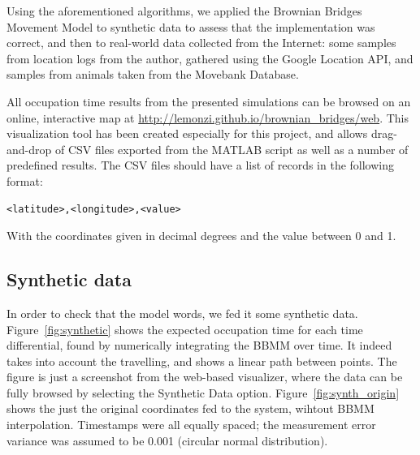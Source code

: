 \documentclass[12pt]{article}
\begin{document}
Using the aforementioned algorithms, we applied the Brownian Bridges Movement Model to synthetic data to assess that the implementation was correct, and then to real-world data collected from the Internet: some samples from location logs from the author, gathered using the Google Location API, and samples from animals taken from the Movebank Database.

All occupation time results from the presented simulations can be browsed on an online, interactive map at \url{http://lemonzi.github.io/brownian_bridges/web}. This visualization tool has been created especially for this project, and allows drag-and-drop of CSV files exported from the MATLAB script as well as a number of predefined results. The CSV files should have a list of records in the following format:

\begin{verbatim}
<latitude>,<longitude>,<value>
\end{verbatim}

With the coordinates given in decimal degrees and the value between 0 and 1.

\subsection{Synthetic data}

In order to check that the model words, we fed it some synthetic data. Figure~\ref{fig:synthetic} shows the expected occupation time for each time differential, found by numerically integrating the BBMM over time. It indeed takes into account the travelling, and shows a linear path between points. The figure is just a screenshot from the web-based visualizer, where the data can be fully browsed by selecting the Synthetic Data option. Figure~\ref{fig:synth_origin} shows the just the original coordinates fed to the system, wihtout BBMM interpolation. Timestamps were all equally spaced; the measurement error variance was assumed to be 0.001 (circular normal distribution).
\end{document}
